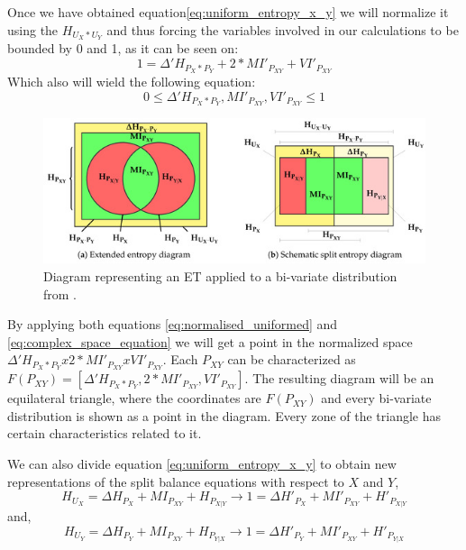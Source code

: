 Once we have obtained equation\ref{eq:uniform_entropy_x_y} we will normalize it using the  $H_{U_{X} * U_{Y}}$ and thus forcing the variables involved in our calculations to be bounded by 0 and 1, as it can be seen on:
%
\begin{equation}\label{eq:normalised_uniformed}
1 = \Delta'H_{P_{X} * P_{Y}} + 2 * MI'_{P_{XY}} + VI'_{P_{XY}} 
\end{equation}
Which also will wield the following equation:
\begin{equation}\label{eq:complex_space_equation}
0 \leq \Delta'H_{P_{X} * P_{Y}}, MI'_{P_{XY}}, VI'_{P_{XY}}  \leq 1
\end{equation}
\newline
\begin{figure}[H]
 \centering
  \includegraphics[width=14cm]{Figuras_tfg/ET_Diagram}
  \caption{Diagram representing an ET applied to a bi-variate distribution from \cite{val:pel:18c}.}
 \label{fig:figure_diagram_et}
\end{figure} 


By applying both equations \ref{eq:normalised_uniformed} and \ref{eq:complex_space_equation} we will get a point in the normalized space  $\Delta'H_{P_{X} * P_{Y}} x 2*MI'_{P_{XY}} x VI'_{P_{XY}}$. Each $P_{XY}$ can be characterized as $F(P_{XY}) = [\Delta'H_{P_{X} * P_{Y}},2*MI'_{P_{XY}},VI'_{P_{XY}}] $. The resulting diagram will be an equilateral triangle, where the coordinates are $F(P_{XY})$ and every bi-variate distribution is shown as a point in the diagram. Every zone of the triangle has certain characteristics related to it. \par

We can also divide equation \ref{eq:uniform_entropy_x_y} to obtain new representations of the split balance equations with respect to $X$ and $Y$,
%
\begin{equation}\label{eq:entropy_x_balance}
H_{U_{X}} = \Delta H_{P_{X}} + MI_{P_{XY}} + H_{P_{X|Y}}  \rightarrow 1 = \Delta H'_{P_{X}} + MI'_{P_{XY}} + H'_{P_{X|Y}}
\end{equation}
and,
\begin{equation}\label{eq:entropy_y_balance}
H_{U_{Y}} = \Delta H_{P_{Y}} + MI_{P_{XY}} + H_{P_{Y|X}}  \rightarrow 1 = \Delta H'_{P_{Y}} + MI'_{P_{XY}} + H'_{P_{Y|X}}
\end{equation}

